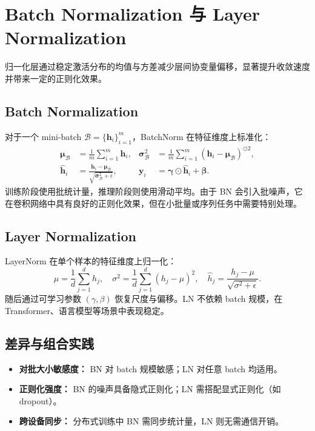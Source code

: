 \documentclass[UTF8,zihao=-4]{ctexart}
\begin{document}
\section{Batch Normalization 与 Layer Normalization}
归一化层通过稳定激活分布的均值与方差减少层间协变量偏移，显著提升收敛速度并带来一定的正则化效果。

\subsection{Batch Normalization}
对于一个 mini-batch $\mathcal{B} = \{\mathbf{h}_i\}_{i=1}^{m}$，BatchNorm 在特征维度上标准化：
\begin{align}
  \boldsymbol{\mu}_\mathcal{B} &= \frac{1}{m} \sum_{i=1}^{m} \mathbf{h}_i, &
  \boldsymbol{\sigma}_\mathcal{B}^2 &= \frac{1}{m} \sum_{i=1}^{m} (\mathbf{h}_i - \boldsymbol{\mu}_\mathcal{B})^{\odot 2}, \\
  \hat{\mathbf{h}}_i &= \frac{\mathbf{h}_i - \boldsymbol{\mu}_\mathcal{B}}{\sqrt{\boldsymbol{\sigma}_\mathcal{B}^2 + \epsilon}}, &
  \mathbf{y}_i &= \boldsymbol{\gamma} \odot \hat{\mathbf{h}}_i + \boldsymbol{\beta}.
\end{align}
训练阶段使用批统计量，推理阶段则使用滑动平均。由于 BN 会引入批噪声，它在卷积网络中具有良好的正则化效果，但在小批量或序列任务中需要特别处理。

\subsection{Layer Normalization}
LayerNorm 在单个样本的特征维度上归一化：
\begin{equation}
  \mu = \frac{1}{d} \sum_{j=1}^{d} h_j, \quad \sigma^2 = \frac{1}{d} \sum_{j=1}^{d} (h_j - \mu)^2, \quad \hat{h}_j = \frac{h_j - \mu}{\sqrt{\sigma^2 + \epsilon}}.
\end{equation}
随后通过可学习参数 $(\gamma, \beta)$ 恢复尺度与偏移。LN 不依赖 batch 规模，在 Transformer、语言模型等场景中表现稳定。

\subsection{差异与组合实践}
\begin{itemize}
  \item \textbf{对批大小敏感度：} BN 对 batch 规模敏感；LN 对任意 batch 均适用。
  \item \textbf{正则化强度：} BN 的噪声具备隐式正则化；LN 需搭配显式正则化（如 dropout）。
  \item \textbf{跨设备同步：} 分布式训练中 BN 需同步统计量，LN 则无需通信开销。
\end{itemize}
\end{document}
